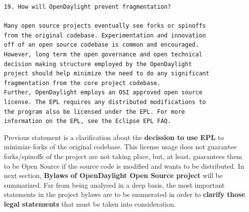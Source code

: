 \documentclass[a4paper, 12pt]{book}
\begin{document}
\begin{verbatim}
19. How will OpenDaylight prevent fragmentation?

Many open source projects eventually see forks or spinoffs
from the original codebase. Experimentation and innovation
off of an open source codebase is common and encouraged.
However, long term the open governance and open technical
decision making structure employed by the OpenDaylight
project should help minimize the need to do any significant
fragmentation from the core project codebase.
Further, OpenDaylight employs an OSI approved open source
license. The EPL requires any distributed modifications to
the program also be licensed under the EPL. For more
information on the EPL, see the Eclipse EPL FAQ.
\end{verbatim}
\noindent Previous statement is a clarification about the \textbf{decission to use EPL} to minimize forks of the original codebase. This license usage does not guarantee forks/spinoffs of the project are not taking place, but, at least, guarantees them to be Open Source if the source code is modified and wants to be distributed. In next section, \textbf{Bylaws of OpenDaylight Open Source project} will be summarized. Far from being analysed in a deep basis, the most important statements in the project bylaws are to be enumerated in order to \textbf{clarify those legal statements} that must be taken into consideration.
\end{document}
